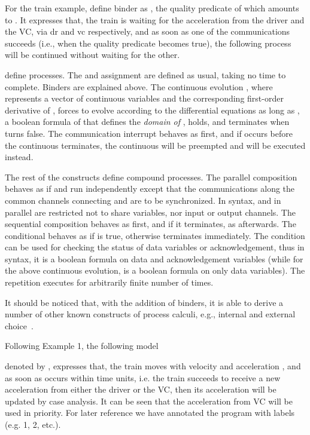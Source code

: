 \documentclass{llncs}
\begin{document}
\example For the train example, define binder  as
,
the quality predicate
of which amounts to .
It expresses that,
the train is waiting for the acceleration from the driver and the VC, via \textsf{dr} and \textsf{vc} respectively,
and
as soon as one of the communications succeeds (i.e., when the quality predicate becomes true),
the following process will be continued without waiting for the other. 

  define processes. The
 and assignment  are defined as usual, taking no time to complete.
Binders  are explained above.
The continuous evolution , where  represents a vector of continuous variables and
 the corresponding  first-order derivative of ,
forces   to evolve according to the differential equations  as long as ,
a boolean formula of  that  defines the {\em domain of }, holds, and terminates when  turns false. The communication interrupt  behaves as  first,
and if  occurs before the continuous terminates,  the continuous  will be preempted  and
 will be executed instead.

The rest of the  constructs define compound processes. The parallel composition 
behaves as if  and  run independently
except that the communications along the common channels connecting  and  are to be synchronized.
In syntax,  and  in parallel are restricted not to
share variables, nor input or output channels.
The sequential composition  behaves as  first, and if it terminates, as  afterwards.
The conditional  behaves as  if  is true, otherwise terminates immediately. The condition  can be used for 
checking the status of data variables or acknowledgement, thus in syntax,
it is a boolean formula on data and acknowledgement variables (while for
the above continuous evolution,   is a boolean formula on only data variables). The
repetition  executes  for arbitrarily finite number of times.

It should be noticed that, with the addition of binders, it is able to derive a number of other
known constructs of process calculi, e.g., internal
and external choice~\cite{RNV12}.



\example
Following Example 1,  the following model

denoted by , expresses that, the train moves with velocity  and acceleration , and as soon as  occurs within  time units, i.e.
 the train succeeds to receive a new acceleration from either the driver or the VC,
 then its acceleration  will be updated by case analysis. It can be seen that the acceleration from VC will be used in priority.
For later reference we have annotated the program with labels (e.g. 1, 2, etc.). 
\end{document}
